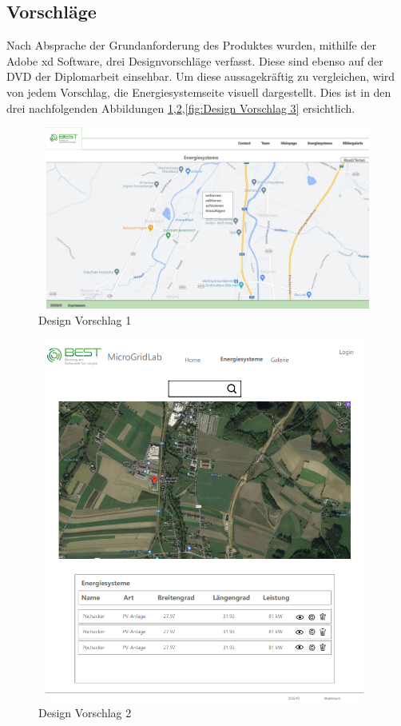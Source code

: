 \subsection{Vorschläge}
Nach Absprache der Grundanforderung des Produktes wurden, mithilfe der Adobe xd Software,  drei Designvorschläge verfasst. Diese sind ebenso auf der DVD der Diplomarbeit einsehbar. Um diese aussagekräftig zu vergleichen, wird von jedem Vorschlag, die Energiesystemseite visuell dargestellt. Dies ist in den drei nachfolgenden Abbildungen \ref{fig:Design Vorschlag 1},\space\ref{fig:Design Vorschlag 2},\space\ref{fig:Design Vorschlag 3} ersichtlich.
\begin{figure}[h]
	\centering
	\includegraphics[height=6cm,width=12cm]{images/DesignVorschlag1}
	\caption{Design Vorschlag 1}
	\label{fig:Design Vorschlag 1}
\end{figure}
\newpage
\begin{figure}[h]
	\centering
	\includegraphics[height=12cm,width=11cm]{images/DesignVorschlag2}
	\caption{Design Vorschlag 2}
	\label{fig:Design Vorschlag 2}
\end{figure}
